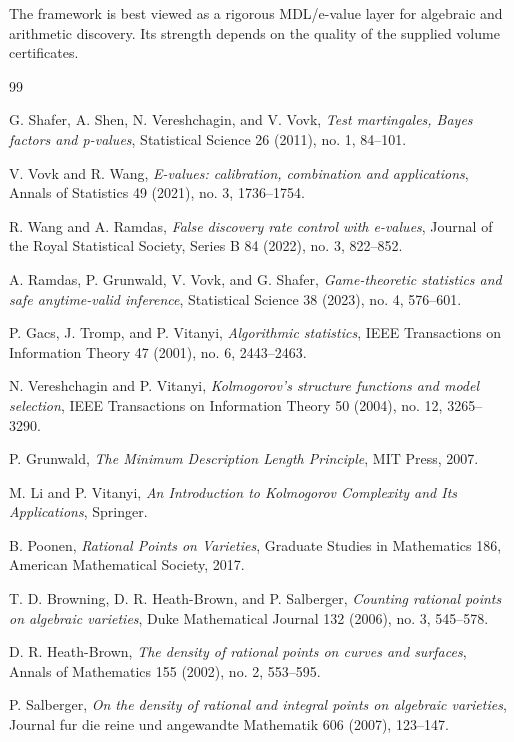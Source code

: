 \documentclass[11pt]{article}
\begin{document}
The framework is best viewed as a rigorous MDL/e-value layer for algebraic and arithmetic discovery. Its strength depends on the quality of the supplied volume certificates.

\begin{thebibliography}{99}
\small
\sloppy

G. Shafer, A. Shen, N. Vereshchagin, and V. Vovk,
\emph{Test martingales, Bayes factors and p-values},
Statistical Science 26 (2011), no. 1, 84--101.

V. Vovk and R. Wang,
\emph{E-values: calibration, combination and applications},
Annals of Statistics 49 (2021), no. 3, 1736--1754.

R. Wang and A. Ramdas,
\emph{False discovery rate control with e-values},
Journal of the Royal Statistical Society, Series B 84 (2022), no. 3, 822--852.

A. Ramdas, P. Grunwald, V. Vovk, and G. Shafer,
\emph{Game-theoretic statistics and safe anytime-valid inference},
Statistical Science 38 (2023), no. 4, 576--601.

P. Gacs, J. Tromp, and P. Vitanyi,
\emph{Algorithmic statistics},
IEEE Transactions on Information Theory 47 (2001), no. 6, 2443--2463.

N. Vereshchagin and P. Vitanyi,
\emph{Kolmogorov's structure functions and model selection},
IEEE Transactions on Information Theory 50 (2004), no. 12, 3265--3290.

P. Grunwald,
\emph{The Minimum Description Length Principle},
MIT Press, 2007.

M. Li and P. Vitanyi,
\emph{An Introduction to Kolmogorov Complexity and Its Applications},
Springer.

B. Poonen,
\emph{Rational Points on Varieties},
Graduate Studies in Mathematics 186, American Mathematical Society, 2017.

T. D. Browning, D. R. Heath-Brown, and P. Salberger,
\emph{Counting rational points on algebraic varieties},
Duke Mathematical Journal 132 (2006), no. 3, 545--578.

D. R. Heath-Brown,
\emph{The density of rational points on curves and surfaces},
Annals of Mathematics 155 (2002), no. 2, 553--595.

P. Salberger,
\emph{On the density of rational and integral points on algebraic varieties},
Journal fur die reine und angewandte Mathematik 606 (2007), 123--147.


\end{thebibliography}
\end{document}
